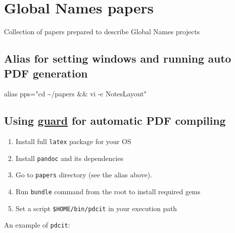 \documentclass[
]{article}
\author{}
\date{}
\newenvironment{Shaded}{}{}
\newcommand{\BuiltInTok}[1]{#1}
\newcommand{\NormalTok}[1]{#1}
\newcommand{\StringTok}[1]{\textcolor[rgb]{0.25,0.44,0.63}{#1}}
\providecommand{\tightlist}{%
  \setlength{\itemsep}{0pt}\setlength{\parskip}{0pt}}
\begin{document}
\hypertarget{global-names-papers}{%
\section{Global Names papers}\label{global-names-papers}}

Collection of papers prepared to describe Global Names projects

\hypertarget{alias-for-setting-windows-and-running-auto-pdf-generation}{%
\subsection{Alias for setting windows and running auto PDF
generation}\label{alias-for-setting-windows-and-running-auto-pdf-generation}}

\begin{Shaded}
\begin{Highlighting}[]
\BuiltInTok{alias}\NormalTok{ pps=}\StringTok{"cd \textasciitilde{}/papers \&\& vi {-}c NotesLayout"}
\end{Highlighting}
\end{Shaded}

\hypertarget{using-guard-for-automatic-pdf-compiling}{%
\subsection{\texorpdfstring{Using
\href{https://github.com/guard/guard}{guard} for automatic PDF
compiling}{Using guard for automatic PDF compiling}}\label{using-guard-for-automatic-pdf-compiling}}

\begin{enumerate}
\def\labelenumi{\arabic{enumi}.}
\tightlist
\item
  Install full \texttt{latex} package for your OS
\item
  Install \texttt{pandoc} and its dependencies
\item
  Go to \texttt{papers} directory (see the alias above).
\item
  Run \texttt{bundle} command from the root to install required gems
\item
  Set a script \texttt{\$HOME/bin/pdcit} in your execution path
\end{enumerate}

An example of \texttt{pdcit}:
\end{document}
